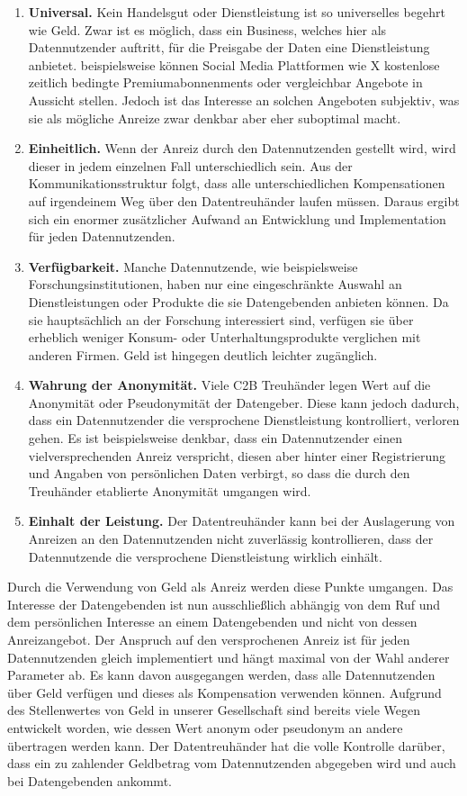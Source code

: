 \documentclass[
	fontsize=12pt,
	headings=small,
	parskip=half,           %
	bibliography=totoc,
	numbers=noenddot,       %
	open=any,               %
]{scrreprt}
\begin{document}
\begin{enumerate}
    \item \textbf{Universal.} Kein Handelsgut oder Dienstleistung ist so universelles begehrt wie Geld. Zwar ist es möglich, dass ein Business, welches hier als Datennutzender auftritt, für die Preisgabe der Daten eine Dienstleistung anbietet. beispielsweise können Social Media Plattformen wie X kostenlose zeitlich bedingte Premiumabonnenments oder vergleichbar Angebote in Aussicht stellen. Jedoch ist das Interesse an solchen Angeboten subjektiv, was sie als mögliche Anreize zwar denkbar aber eher suboptimal macht.
    \item \textbf{Einheitlich.} Wenn der Anreiz durch den Datennutzenden gestellt wird, wird dieser in jedem einzelnen Fall unterschiedlich sein. Aus der Kommunikationsstruktur folgt, dass alle unterschiedlichen Kompensationen auf irgendeinem Weg über den Datentreuhänder laufen müssen. Daraus ergibt sich ein enormer zusätzlicher Aufwand an Entwicklung und Implementation für jeden Datennutzenden.
    \item \textbf{Verfügbarkeit.} Manche Datennutzende, wie beispielsweise Forschungsinstitutionen, haben nur eine eingeschränkte Auswahl an Dienstleistungen oder Produkte die sie Datengebenden anbieten können. Da sie hauptsächlich an der Forschung interessiert sind, verfügen sie über erheblich weniger Konsum- oder Unterhaltungsprodukte verglichen mit anderen Firmen. Geld ist hingegen deutlich leichter zugänglich.
    \item \textbf{Wahrung der Anonymität.} Viele C2B Treuhänder legen Wert auf die Anonymität oder Pseudonymität der Datengeber. Diese kann jedoch dadurch, dass ein Datennutzender die versprochene Dienstleistung kontrolliert, verloren gehen. Es ist beispielsweise denkbar, dass ein Datennutzender einen vielversprechenden Anreiz verspricht, diesen aber hinter einer Registrierung und Angaben von persönlichen Daten verbirgt, so dass die durch den Treuhänder etablierte Anonymität umgangen wird.
    \item \textbf{Einhalt der Leistung.} Der Datentreuhänder kann bei der Auslagerung von Anreizen an den Datennutzenden nicht zuverlässig kontrollieren, dass der Datennutzende die versprochene Dienstleistung wirklich einhält.
\end{enumerate}
Durch die Verwendung von Geld als Anreiz werden diese Punkte umgangen. Das Interesse der Datengebenden ist nun ausschließlich abhängig von dem Ruf und dem persönlichen Interesse an einem Datengebenden und nicht von dessen Anreizangebot. Der Anspruch auf den versprochenen Anreiz ist für jeden Datennutzenden gleich implementiert und hängt maximal von der Wahl anderer Parameter ab. Es kann davon ausgegangen werden, dass alle Datennutzenden über Geld verfügen und dieses als Kompensation verwenden können. Aufgrund des Stellenwertes von Geld in unserer Gesellschaft sind bereits viele Wegen entwickelt worden, wie dessen Wert anonym oder pseudonym an andere übertragen werden kann. Der Datentreuhänder hat die volle Kontrolle darüber, dass ein zu zahlender Geldbetrag vom Datennutzenden abgegeben wird und auch bei Datengebenden ankommt.
\end{document}
